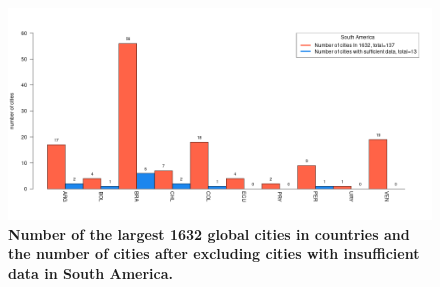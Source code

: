 \documentclass[preprint,10pt]{elsarticle} %
\begin{document}
\begin{figure}
\centering
\includegraphics[trim={ 0 35 25 50 },clip,scale=0.45]{Images/South America_cities.png}
\caption{\bf Number of the largest 1632 global cities in countries and the number of cities after excluding cities with insufficient data in South America.}
 \label{fig:southhamerica}
\end{figure}
\end{document}
